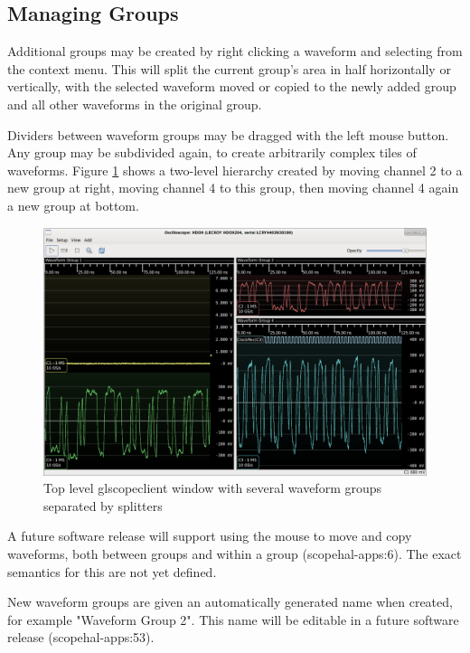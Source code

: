 \subsection{Managing Groups}

Additional groups may be created by right clicking a waveform and selecting  from the context menu. This will split the current group's area in half horizontally or
vertically, with the selected waveform moved or copied to the newly added group and all other waveforms in the original
group.

Dividers between waveform groups may be dragged with the left mouse button. Any group may be subdivided again, to
create arbitrarily complex tiles of waveforms. Figure \ref{multiple-groups} shows a two-level hierarchy created by
moving channel 2 to a new group at right, moving channel 4 to this group, then moving channel 4 again a new group at
bottom.

\begin{figure}[h]
\centering
\includegraphics[width=14cm]{images/multiple-groups.png}
\caption{Top level glscopeclient window with several waveform groups separated by splitters}
\label{multiple-groups}
\end{figure}

A future software release will support using the mouse to move and copy waveforms, both between groups and within a
group (scopehal-apps:6). The exact semantics for this are not yet defined.

New waveform groups are given an automatically generated name when created, for example "Waveform Group 2". This name
will be editable in a future software release (scopehal-apps:53).

